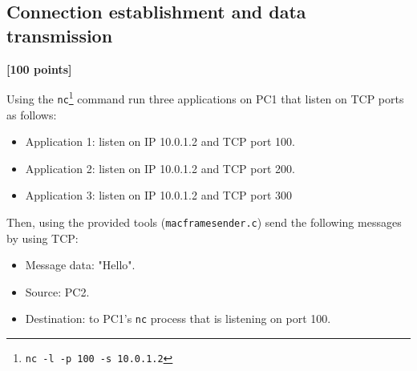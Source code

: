 \documentclass[pdftex,12pt,a4paper]{article}
\begin{document}
        \subsection{Connection establishment and data transmission}
            \begin{flushright}
                \textbf{[100 points]}
            \end{flushright}

            Using the \texttt{nc}\footnote{\texttt{nc -l -p 100 -s 10.0.1.2}}
            command run three applications on PC1 that listen on TCP ports as
            follows:
            \begin{itemize}
                \item Application 1: listen on IP 10.0.1.2 and TCP port 100.
                \item Application 2: listen on IP 10.0.1.2 and TCP port 200.
                \item Application 3: listen on IP 10.0.1.2 and TCP port 300
            \end{itemize}

            Then, using the provided tools (\texttt{macframesender.c}) send the
            following messages by using TCP:
            \begin{itemize}
                \item Message data: "Hello".
                \item Source: PC2. 
                \item Destination: to PC1's \texttt{nc} process that is
                    listening on port 100.
            \end{itemize}
\end{document}
